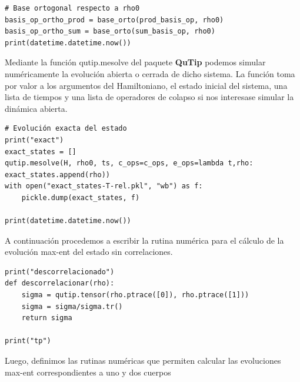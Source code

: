 \documentclass{report} %
\numberwithin{equation}{section}
\begin{document}
\begin{verbatim}
# Base ortogonal respecto a rho0
basis_op_ortho_prod = base_orto(prod_basis_op, rho0)
basis_op_ortho_sum = base_orto(sum_basis_op, rho0)
print(datetime.datetime.now())
\end{verbatim}

Mediante la función qutip.mesolve del paquete \textbf{QuTip} podemos simular numéricamente la evolución abierta o cerrada de dicho sistema. La función toma por valor a los argumentos del Hamiltoniano, el estado inicial del sistema, una lista de tiempos y una lista de operadores de colapso si nos interesase simular la dinámica abierta.

\begin{verbatim}
# Evolución exacta del estado
print("exact")
exact_states = []
qutip.mesolve(H, rho0, ts, c_ops=c_ops, e_ops=lambda t,rho: exact_states.append(rho))
with open("exact_states-T-rel.pkl", "wb") as f:
    pickle.dump(exact_states, f)

print(datetime.datetime.now())
\end{verbatim}


A continuación procedemos a escribir la rutina numérica para el cálculo de la evolución max-ent del estado sin correlaciones.

\begin{verbatim}
print("descorrelacionado")
def descorrelacionar(rho):
    sigma = qutip.tensor(rho.ptrace([0]), rho.ptrace([1]))
    sigma = sigma/sigma.tr()
    return sigma

print("tp")
\end{verbatim}

Luego, definimos las rutinas numéricas que permiten calcular las evoluciones max-ent correspondientes a uno y dos cuerpos
\end{document}
